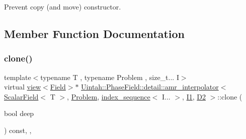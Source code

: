 Prevent copy (and move) constructor. 



\subsection{Member Function Documentation}
\mbox{\label{classUintah_1_1PhaseField_1_1detail_1_1amr__interpolator_3_01ScalarField_3_01T_01_4_00_01Problemd2db9de1754b5450c93c191a9275f5ed_a81fe3ebe5215f1879c8fcacad90a240e}} 
\subsubsection{\texorpdfstring{clone()}{clone()}\hspace{0.1cm}{\footnotesize\ttfamily [1/2]}}
{\footnotesize\ttfamily template$<$typename T , typename Problem , size\+\_\+t... I$>$ \\
virtual \hyperlink{classUintah_1_1PhaseField_1_1detail_1_1view}{view}$<$\hyperlink{structUintah_1_1PhaseField_1_1ScalarField}{Field}$>$$\ast$ \hyperlink{classUintah_1_1PhaseField_1_1detail_1_1amr__interpolator}{Uintah\+::\+Phase\+Field\+::detail\+::amr\+\_\+interpolator}$<$ \hyperlink{structUintah_1_1PhaseField_1_1ScalarField}{Scalar\+Field}$<$ T $>$, \hyperlink{classUintah_1_1PhaseField_1_1Problem}{Problem}, \hyperlink{namespaceUintah_1_1PhaseField_a237de804d99512e50613aff7c94a9461}{index\+\_\+sequence}$<$ I... $>$, \hyperlink{namespaceUintah_1_1PhaseField_a547ce3002aa97fbd3ef3192a6eec8406a66f19efe774b0d2b6e5844eb2d83d305}{I1}, \hyperlink{namespaceUintah_1_1PhaseField_a12bfc68444894dffdf0cb8d9cf0cc76aa1a451dae278b0103a94105c8776e9a67}{D2} $>$\+::clone (\begin{DoxyParamCaption}\item[{bool}]{deep }\end{DoxyParamCaption}) const\hspace{0.3cm}{\ttfamily [inline]}, {\ttfamily [override]}, {\ttfamily [virtual]}}



